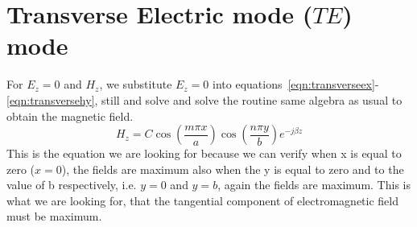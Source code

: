 \section{Transverse Electric mode ($TE$) mode}
For $E_{z} = 0$ and $H_{z}$, we substitute $E_{z} = 0$ into equations~\ref{eqn:transverseex}-\ref{eqn:transversehy}, still and solve and solve the routine same algebra as usual to obtain the magnetic field.
\begin{equation}
H_z = C\cos\left(\frac{m\pi x}{a}\right) \cos\left(\frac{n\pi y}{b}\right)e^{-j\beta z}
\end{equation}
This is the equation we are looking for because we can verify when x is equal to zero ($x = 0$), the fields are maximum also when the y is equal to zero and to the value of b respectively, i.e. $y = 0$ and $y = b$, again the fields are maximum. This is what we are looking for, that the tangential component of electromagnetic field must be maximum.